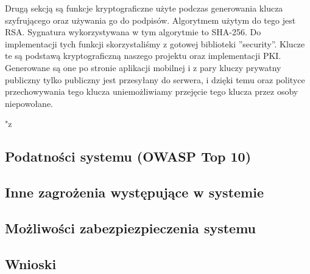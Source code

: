 Drugą sekcją są funkcje kryptograficzne użyte podczas generowania klucza szyfrującego oraz używania go do podpisów. Algorytmem użytym do tego jest RSA. Sygnatura wykorzystywana w tym algorytmie to SHA-256. Do implementacji tych funkcji skorzystaliśmy z gotowej biblioteki ''security''. Klucze te są podstawą kryptograficzną naszego projektu oraz implementacji PKI. Generowane są one po stronie aplikacji mobilnej i z pary kluczy prywatny publiczny tylko publiczny jest przesyłany do serwera, i dzięki temu oraz polityce przechowywania tego klucza uniemożliwiamy przejęcie tego klucza przez osoby niepowołane.     

"z

\newpage
\subsection[Podatności systemu (OWASP Top 10)]{Podatności systemu (OWASP Top 10) \newline [\StudentA]}

\newpage
\subsection[Inne zagrożenia występujące w systemie]{Inne zagrożenia występujące w systemie \newline [\StudentB]}

\newpage
\subsection[Możliwości zabezpiezpieczenia systemu]{Możliwości zabezpiezpieczenia systemu \newline [\StudentA]}

\newpage
\subsection{Wnioski}
 
